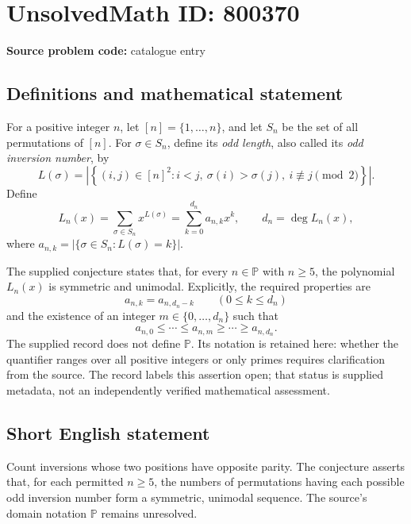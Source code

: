 \documentclass[11pt]{article}
\begin{document}
\section*{UnsolvedMath ID: 800370}
\textbf{Source problem code:} catalogue entry
\subsection{Definitions and mathematical statement}
For a positive integer \(n\), let \([n]=\{1,\ldots,n\}\), and let \(S_n\) be the set of all permutations of \([n]\). For \(\sigma\in S_n\), define its \emph{odd length}, also called its \emph{odd inversion number}, by
\[
L(\sigma)=\left|\left\{(i,j)\in[n]^2:i<j,\ \sigma(i)>\sigma(j),\ i\not\equiv j\pmod 2\right\}\right|.
\]
Define
\[
L_n(x)=\sum_{\sigma\in S_n}x^{L(\sigma)}
      =\sum_{k=0}^{d_n}a_{n,k}x^k,
\qquad d_n=\deg L_n(x),
\]
where \(a_{n,k}=|\{\sigma\in S_n:L(\sigma)=k\}|\).

The supplied conjecture states that, for every \(n\in\mathbb{P}\) with \(n\geq5\), the polynomial \(L_n(x)\) is symmetric and unimodal. Explicitly, the required properties are
\[
a_{n,k}=a_{n,d_n-k}\qquad(0\leq k\leq d_n)
\]
and the existence of an integer \(m\in\{0,\ldots,d_n\}\) such that
\[
a_{n,0}\leq\cdots\leq a_{n,m}\geq\cdots\geq a_{n,d_n}.
\]
The supplied record does not define \(\mathbb{P}\). Its notation is retained here: whether the quantifier ranges over all positive integers or only primes requires clarification from the source. The record labels this assertion open; that status is supplied metadata, not an independently verified mathematical assessment.
\subsection{Short English statement}
Count inversions whose two positions have opposite parity. The conjecture asserts that, for each permitted \(n\geq5\), the numbers of permutations having each possible odd inversion number form a symmetric, unimodal sequence. The source's domain notation \(\mathbb{P}\) remains unresolved.
\end{document}
